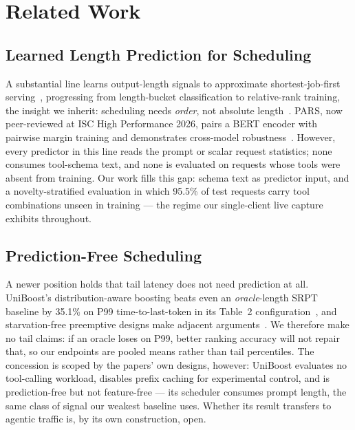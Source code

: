 \section{Related Work}

\subsection{Learned Length Prediction for Scheduling}
A substantial line learns output-length signals to approximate
shortest-job-first serving~\cite{ssjf2024,fuLTR2024,tao2026ranking,elis2025},
progressing from length-bucket classification to relative-rank training, the
insight we inherit: scheduling needs \emph{order}, not absolute
length~\cite{fuLTR2024}. PARS, now peer-reviewed at ISC High Performance
2026, pairs a BERT encoder with pairwise margin training and demonstrates
cross-model robustness~\cite{tao2026ranking}. However, every predictor in
this line reads the prompt or scalar request statistics; none consumes
tool-schema text, and none is evaluated on requests whose tools were absent
from training. Our work fills this gap: schema text as
predictor input, and a novelty-stratified evaluation in which 95.5\% of test
requests carry tool combinations unseen in training --- the regime our
single-client live capture exhibits throughout.

\subsection{Prediction-Free Scheduling}
A newer position holds that tail latency does not need prediction at all.
UniBoost's distribution-aware boosting beats even an \emph{oracle}-length
SRPT baseline by 35.1\% on P99 time-to-last-token in its Table~2
configuration~\cite{beyondPrediction2026}, and starvation-free preemptive
designs make adjacent arguments~\cite{fastServe2026,tie2026}. We
therefore make no tail claims: if an oracle loses on P99, better ranking
accuracy will not repair that, so our endpoints are pooled means rather
than tail percentiles. The concession is scoped by the papers' own designs, however:
UniBoost evaluates no tool-calling workload, disables prefix caching for
experimental control, and is prediction-free but not feature-free --- its
scheduler consumes prompt length, the same class of signal our weakest
baseline uses. Whether its result transfers to agentic traffic is, by its
own construction, open.

